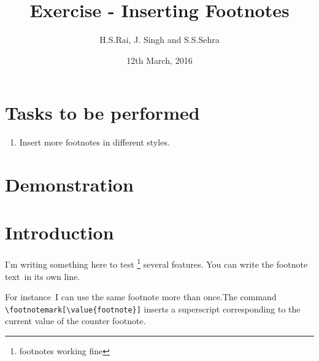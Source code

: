 \documentclass{article}
\title{Exercise - Inserting Footnotes}
\author{H.S.Rai, J. Singh and S.S.Sehra}
\date{12th March, 2016}
\begin{document}
	\maketitle	
	\section*{Tasks to be performed}
	\begin{enumerate}	
		\item Insert more footnotes in different styles.
	\end{enumerate}
	\section*{Demonstration}

\section{Introduction}
I'm writing something here to test  \footnote{footnotes working fine} several features. You can write the footnote text\footnotemark\ in its own line.


For instance\footnotemark\ I can use the same footnote more than once\footnotemark[\value{footnote}].The command \verb|\footnotemark[\value{footnote}]| inserts a superscript corresponding to the current value of the counter footnote.


\end{document}
